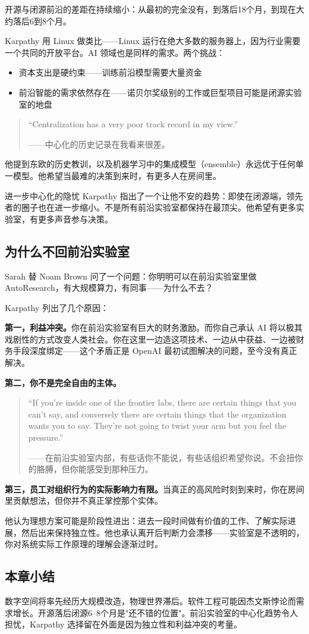 开源与闭源前沿的差距在持续缩小：从最初的完全没有，到落后18个月，到现在大约落后6到8个月。

Karpathy 用 Linux 做类比——Linux 运行在绝大多数的服务器上，因为行业需要一个共同的开放平台。AI 领域也是同样的需求。两个挑战：
\begin{itemize}
    \item 资本支出是硬约束——训练前沿模型需要大量资金
    \item 前沿智能的需求依然存在——诺贝尔奖级别的工作或巨型项目可能是闭源实验室的地盘
\end{itemize}

\begin{quote}
``Centralization has a very poor track record in my view.''

——中心化的历史记录在我看来很差。
\end{quote}

他提到东欧的历史教训，以及机器学习中的集成模型（ensemble）永远优于任何单一模型。他希望当最难的决策到来时，有更多人在房间里。

\begin{warningbox}{进一步中心化的隐忧}
Karpathy 指出了一个让他不安的趋势：即使在闭源端，领先者的圈子也在进一步缩小。不是所有前沿实验室都保持在最顶尖。他希望有更多实验室，有更多声音参与决策。
\end{warningbox}

\subsection{为什么不回前沿实验室}

Sarah 替 Noam Brown 问了一个问题：你明明可以在前沿实验室里做 AutoResearch，有大规模算力，有同事——为什么不去？

Karpathy 列出了几个原因：

\textbf{第一，利益冲突。}你在前沿实验室有巨大的财务激励。而你自己承认 AI 将以极其戏剧性的方式改变人类社会。你在这里一边造这项技术、一边从中获益、一边被财务手段深度绑定——这个矛盾正是 OpenAI 最初试图解决的问题，至今没有真正解决。

\textbf{第二，你不是完全自由的主体。}

\begin{quote}
``If you're inside one of the frontier labs, there are certain things that you can't say, and conversely there are certain things that the organization wants you to say. They're not going to twist your arm but you feel the pressure.''

——在前沿实验室内部，有些话你不能说，有些话组织希望你说。不会扭你的胳膊，但你能感受到那种压力。
\end{quote}

\textbf{第三，员工对组织行为的实际影响力有限。}当真正的高风险时刻到来时，你在房间里贡献想法，但你并不真正掌控那个实体。

他认为理想方案可能是阶段性进出：进去一段时间做有价值的工作、了解实际进展，然后出来保持独立性。他也承认离开后判断力会漂移——实验室是不透明的，你对系统实际工作原理的理解会逐渐过时。

\subsection{本章小结}

数字空间将率先经历大规模改造，物理世界滞后。软件工程可能因杰文斯悖论而需求增长。开源落后闭源6--8个月是"还不错的位置"。前沿实验室的中心化趋势令人担忧，Karpathy 选择留在外面是因为独立性和利益冲突的考量。


